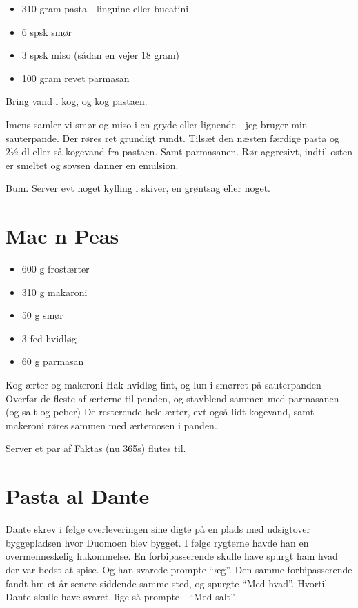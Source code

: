 \documentclass[
]{book}
\providecommand{\tightlist}{%
  \setlength{\itemsep}{0pt}\setlength{\parskip}{0pt}}
\begin{document}
\begin{itemize}
\tightlist
\item
  310 gram pasta - linguine eller bucatini
\item
  6 spsk smør
\item
  3 spsk miso (sådan en vejer 18 gram)
\item
  100 gram revet parmasan
\end{itemize}

Bring vand i kog, og kog pastaen.

Imens samler vi smør og miso i en gryde eller lignende - jeg
bruger min sauterpande. Der røres ret grundigt rundt.
Tilsæt den næsten færdige pasta og 2½ dl eller så kogevand
fra pastaen. Samt parmasanen. Rør aggresivt, indtil
osten er smeltet og sovsen danner en emulsion.

Bum. Server evt noget kylling i skiver, en grøntsag eller noget.

\hypertarget{mac-n-peas}{%
\section{Mac n Peas}\label{mac-n-peas}}

\begin{itemize}
\tightlist
\item
  600 g frostærter
\item
  310 g makaroni
\item
  50 g smør
\item
  3 fed hvidløg
\item
  60 g parmasan
\end{itemize}

Kog ærter og makeroni
Hak hvidløg fint, og lun i smørret på sauterpanden
Overfør de fleste af ærterne til panden, og stavblend sammen med parmasanen (og salt og peber)
De resterende hele ærter, evt også lidt kogevand, samt makeroni røres sammen med ærtemosen i panden.

Server et par af Faktas (nu 365s) flutes til.

\hypertarget{pasta-al-dante}{%
\section{Pasta al Dante}\label{pasta-al-dante}}

Dante skrev i følge overleveringen sine digte på en plads med udsigtover byggepladsen hvor Duomoen blev bygget. I følge rygterne havde han en overmenneskelig hukommelse.
En forbipasserende skulle have spurgt ham hvad der var bedst at spise. Og han svarede prompte ``æg''. Den samme forbipasserende fandt hm et år senere siddende samme sted, og spurgte ``Med hvad''. Hvortil Dante skulle have svaret, lige så prompte - ``Med salt''.
\end{document}
